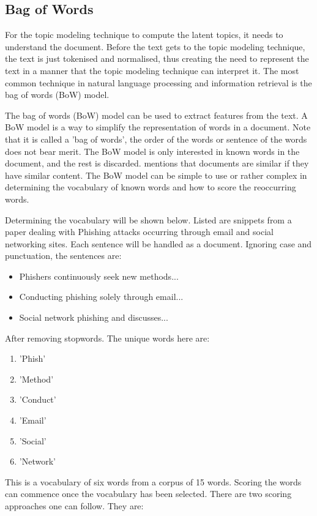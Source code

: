 \subsection{Bag of Words}

For the topic modeling technique to compute the latent topics, it needs to understand the document. Before the text gets to the topic modeling technique, the text is just tokenised and normalised, thus creating the need to represent the text in a manner that the topic modeling technique can interpret it. The most common technique in natural language processing and information retrieval is the bag of words (BoW) model.

The bag of words (BoW) model can be used to extract features from the text. A BoW model is a way to simplify the representation of words in a document. Note that it is called a ’bag of words’, the order of the words or sentence of the words does not bear merit. The BoW model is only interested in known words in the document, and the rest is discarded.  mentions that documents are similar if they have similar content. The BoW model can be simple to use or rather complex in determining the vocabulary of known words and how to score the reoccurring words.

Determining the vocabulary will be shown below. Listed are snippets from a paper dealing with Phishing attacks occurring through email and social networking sites. Each sentence will be handled as a document. Ignoring case and punctuation, the sentences are:

\begin{itemize}
    \item Phishers continuously seek new methods... 
    \item Conducting phishing solely through email...
    \item Social network phishing and discusses...
\end{itemize}
After removing stopwords. The unique words here are:
\begin{enumerate}
    \item 'Phish'
    \item 'Method'
    \item 'Conduct'
    \item 'Email'
    \item 'Social'
    \item 'Network'
\end{enumerate}

This is a vocabulary of six words from a corpus of 15 words. Scoring the words can commence once the vocabulary has been selected. There are two scoring approaches one can follow. They are:

